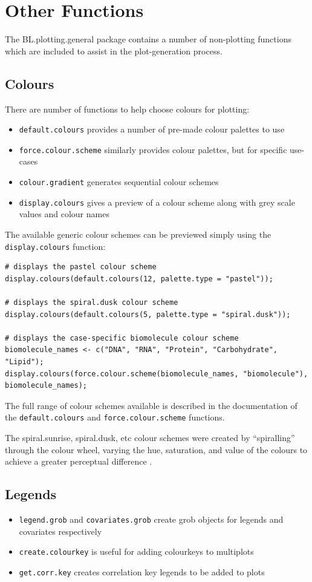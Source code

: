\documentclass[letterpaper]{article}\usepackage[]{graphicx}\usepackage[]{color}
\begin{document}
\section{Other Functions}
The BL.plotting.general package contains a number of non-plotting functions which are included to assist in the plot-generation process. 

\subsection{Colours}
There are number of functions to help choose colours for plotting:
\begin{itemize}
\item \texttt{default.colours} provides a number of pre-made colour palettes to use
\item \texttt{force.colour.scheme} similarly provides colour palettes, but for specific use-cases
\item \texttt{colour.gradient} generates sequential colour schemes
\item \texttt{display.colours} gives a preview of a colour scheme along with grey scale values and colour names
\end{itemize}

The available generic colour schemes can be previewed simply using the \verb|display.colours| function:
\begin{verbatim}
# displays the pastel colour scheme
display.colours(default.colours(12, palette.type = "pastel"));

# displays the spiral.dusk colour scheme
display.colours(default.colours(5, palette.type = "spiral.dusk"));

# displays the case-specific biomolecule colour scheme
biomolecule_names <- c("DNA", "RNA", "Protein", "Carbohydrate", "Lipid");
display.colours(force.colour.scheme(biomolecule_names, "biomolecule"), biomolecule_names);
\end{verbatim}

The full range of colour schemes available is described in the documentation of the \verb|default.colours| and \verb|force.colour.scheme| functions.

The spiral.sunrise, spiral.dusk, etc colour schemes were created by ``spiralling'' through the colour wheel, varying the hue, saturation, and value of the colours to achieve a greater perceptual difference \cite{rainbow} \cite{wong2}. 

\subsection{Legends}
\begin{itemize}
\item \texttt{legend.grob} and \texttt{covariates.grob} create grob objects for legends and covariates respectively
\item \texttt{create.colourkey} is useful for adding colourkeys to multiplots
\item \texttt{get.corr.key} creates correlation key legends to be added to plots
\end{itemize}
\end{document}
